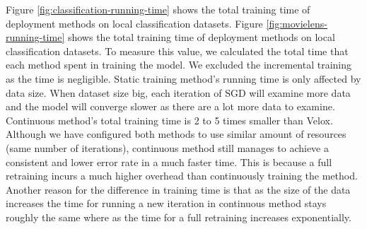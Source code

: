 \documentclass{vldb}
\begin{document}
Figure \ref{fig:classification-running-time} shows the total training time of deployment methods on local classification datasets.
Figure \ref{fig:movielens-running-time} shows the total training time of deployment methods on local classification datasets.
To measure this value, we calculated the total time that each method spent in training the model.
We excluded the incremental training as the time is negligible.
Static training method's running time is only affected by data size.
When dataset size big, each iteration of SGD will examine more data and the model will converge slower as there are a lot more data to examine.
Continuous method's total training time is 2 to 5 times smaller than Velox.
Although we have configured both methods to use similar amount of resources (same number of iterations), continuous method still manages to achieve a consistent and lower error rate in a much faster time.
This is because a full retraining incurs a much higher overhead than continuously training the method.
Another reason for the difference in training time is that as the size of the data increases the time for running a new iteration in continuous method stays roughly the same where as the time for a full retraining increases exponentially.
\end{document}
